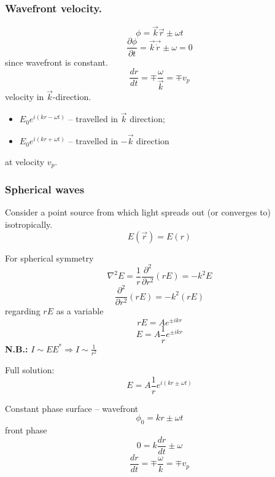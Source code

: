 \documentclass[10pt]{article}
\begin{document}
\subsubsection*{Wavefront velocity.}
\begin{equation*}
\phi = \vec{k}\vec{r} \pm \omega t
\end{equation*}
\begin{equation*}
\frac{\partial \phi}{\partial t} = \vec{k}\vec{\dot{r}} \pm \omega = 0
\end{equation*}
since wavefront is constant.
\begin{equation*}
\frac{dr}{dt} = \mp \frac{\omega}{\vec{k}} = \mp v_p
\end{equation*}
velocity in $\vec{k}$-direction.
\begin{itemize}
\item $E_0 e^{i(kr-\omega t)}$ -- travelled in $\vec{k}$ direction;
\item $E_0 e^{i(kr + \omega t)}$ -- travelled in $-\vec{k}$ direction
\end{itemize}
at velocity $v_p$.

\subsubsection{Spherical waves}
Consider a point source from which light spreads out (or converges to) isotropically.
\begin{equation}\boxed{
E(\vec{r}) = E(r)
}\end{equation}

For spherical symmetry
\begin{equation*}
\nabla^2 E = \frac{1}{r} \frac{\partial^2}{\partial r^2}(rE) = -k^2 E
\end{equation*}
\begin{equation*}
\frac{\partial^2}{\partial r^2}(rE) = -k^2(rE)
\end{equation*}
regarding $rE$ as a variable
\begin{equation*}
rE = A e^{\pm ikr}
\end{equation*}
\begin{equation}\boxed{
E = A \frac{1}{r}e^{\pm ikr}
}\end{equation}
\textbf{N.B.:} $I \sim EE^* \Rightarrow I \sim \frac{1}{r^2}$

Full solution:
\begin{equation*}
E = A \frac{1}{r}e^{i(kr \pm \omega t)}
\end{equation*}

Constant phase surface -- wavefront
\begin{equation*}
\phi_0 = kr \pm \omega t
\end{equation*}
front phase
\begin{equation*}
0 = k\frac{dr}{dt} \pm \omega
\end{equation*}
\begin{equation*}
\frac{dr}{dt} = \mp \frac{\omega}{k} = \mp v_p
\end{equation*}
\end{document}
